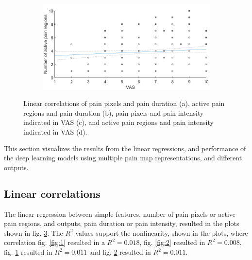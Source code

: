 \begin{figure} [b!]
\begin{tcolorbox}[colframe=black!30!black, colback=white]
\begin{subfigure}[b]{0.51\textwidth}
    \caption{}
    \label{fig:3}
  \end{subfigure}
  \hfill
  \hspace{2mm}
  \begin{subfigure}[b]{0.51\textwidth}
    \includegraphics[width=\textwidth]{Figures/vasregion}
       \caption{ }
    \label{fig:4}
  \end{subfigure}  
  \caption{Linear correlations of pain pixels and pain duration (a), active pain regions and pain duration (b), pain pixels and pain intensity indicated in VAS (c), and active pain regions and pain intensity indicated in VAS (d).}
  \label{fig:correlations}
\end{tcolorbox}
\end{figure}

This section visualizes the results from the linear regressions, and performance of the deep learning models using multiple pain map representations, and different outputs. 
\vspace{-0.3cm}

\subsection{Linear correlations}
The linear regression between simple features, number of pain pixels or active pain regions, and outputs, pain duration or pain intensity, resulted in the plots shown in fig. \ref{fig:correlations}. The $R^2$-values support the nonlinearity, shown in the plots, where correlation fig. \ref{fig:1} resulted in a $R^2 = 0.018$, fig. \ref{fig:2} resulted in $R^2 = 0.008$, fig. \ref{fig:3} resulted in $R^2 = 0.011$ and fig. \ref{fig:4} resulted in $R^2 = 0.011$. 


